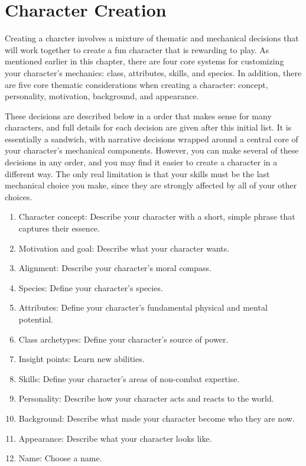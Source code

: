 \section{Character Creation}\label{Character Creation}

    Creating a charcter involves a mixture of thematic and mechanical decisions that will work together to create a fun character that is rewarding to play.
    As mentioned earlier in this chapter, there are four core systems for customizing your character's mechanics: class, attributes, skills, and species.
    In addition, there are five core thematic considerations when creating a character: concept, personality, motivation, background, and appearance.

    These decisions are described below in a order that makes sense for many characters, and full details for each decision are given after this initial list.
    It is essentially a sandwich, with narrative decisions wrapped around a central core of your character's mechanical components.
    However, you can make several of these decisions in any order, and you may find it easier to create a character in a different way.
    The only real limitation is that your skills must be the last mechanical choice you make, since they are strongly affected by all of your other choices.

    \begin{enumerate}
        \item Character concept: Describe your character with a short, simple phrase that captures their essence.
        \item Motivation and goal: Describe what your character wants.
        \item Alignment: Describe your character's moral compass.

        \item Species: Define your character's species.
        \item Attributes: Define your character's fundamental physical and mental potential.
        \item Class archetypes: Define your character's source of power.
        \item Insight points: Learn new abilities.
        \item Skills: Define your character's areas of non-combat expertise.

        \item Personality: Describe how your character acts and reacts to the world.
        \item Background: Describe what made your character become who they are now.
        \item Appearance: Describe what your character looks like.
        \item Name: Choose a name.
    \end{enumerate}

